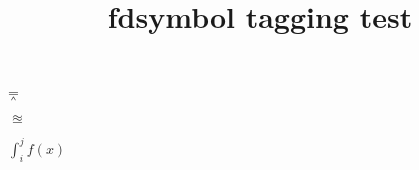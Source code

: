 \documentclass{article}
\title{fdsymbol tagging test}
\begin{document}
\circledR

\circledS

\yen

\dagger

\ddagger

\mathparagraph

\mathsection

\mathdollar

\mathsterling

$\doublebarwedge$

$\approxeq$

$\int_i^j f(x)$
\end{document}
